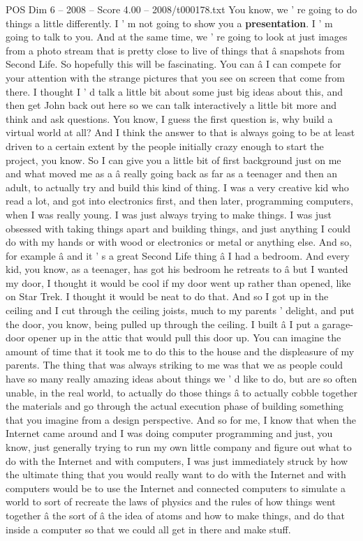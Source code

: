 \begin{textsample}{POS Dim 6 – 2008 – Score 4.00 – 2008/t000178.txt}  \label{ex:f6_pos_012}
You know, we ' re going to do things a little differently.
I ' m not going to show you a \textbf{presentation}.
I ' m going to talk to you.
And at the same time, we ' re going to look at just images from a photo stream that is pretty close to live of things that â snapshots from Second Life.
So hopefully this will be fascinating.
You can â I can compete for your attention with the strange pictures that you see on screen that come from there.
I thought I ' d talk a little bit about some just big ideas about this, and then get John back out here so we can talk interactively a little bit more and think and ask questions.
You know, I guess the first question is, why build a virtual world at all?
And I think the answer to that is always going to be at least driven to a certain extent by the people initially crazy enough to start the project, you know.
So I can give you a little bit of first background just on me and what moved me as a â really going back as far as a teenager and then an adult, to actually try and build this kind of thing.
I was a very creative kid who read a lot, and got into electronics first, and then later, programming computers, when I was really young.
I was just always trying to make things.
I was just obsessed with taking things apart and building things, and just anything I could do with my hands or with wood or electronics or metal or anything else.
And so, for example â and it ' s a great Second Life thing â I had a bedroom.
And every kid, you know, as a teenager, has got his bedroom he retreats to â but I wanted my door, I thought it would be cool if my door went up rather than opened, like on Star Trek.
I thought it would be neat to do that.
And so I got up in the ceiling and I cut through the ceiling joists, much to my parents ' delight, and put the door, you know, being pulled up through the ceiling.
I built â I put a garage-door opener up in the attic that would pull this door up.
You can imagine the amount of time that it took me to do this to the house and the displeasure of my parents.
The thing that was always striking to me was that we as people could have so many really amazing ideas about things we ' d like to do, but are so often unable, in the real world, to actually do those things â to actually cobble together the materials and go through the actual execution phase of building something that you imagine from a design perspective.
And so for me, I know that when the Internet came around and I was doing computer programming and just, you know, just generally trying to run my own little company and figure out what to do with the Internet and with computers, I was just immediately struck by how the ultimate thing that you would really want to do with the Internet and with computers would be to use the Internet and connected computers to simulate a world to sort of recreate the laws of physics and the rules of how things went together â the sort of â the idea of atoms and how to make things, and do that inside a computer so that we could all get in there and make stuff.

\end{textsample}
